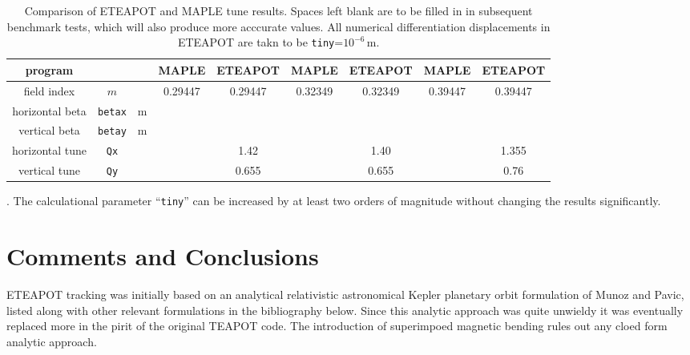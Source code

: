 \documentclass[12pt]{article}
\begin{document}
\begin{table}[h]
\begin{tabular}{|c|c|c|cc|cc|cc|}           \hline
program                    &                        &       &    MAPLE  &  ETEAPOT &   MAPLE  &  ETEAPOT  &  MAPLE    &  ETEAPOT     \\ \hline
field index                 &    $m$             &       &  0.29447 &   0.29447  & 0.32349  &  0.32349    &  0.39447 &  0.39447       \\ \hline 
horizontal beta         & {\tt betax}      &  m &                 &                  &                &                   &                &                      \\
vertical beta             & {\tt betay}      &  m &                 &                  &                &                   &                &                      \\  \hline 
horizontal tune         &  {\tt Qx}         &       &                 &     1.42      &                &    1.40        &                &    1.355         \\ 
vertical tune             &  {\tt Qy}         &       &                 &     0.655    &                &    0.655      &                &    0.76           \\  \hline
\end{tabular}
\caption{\label{tbl:benchmarkParams.P1.0}Comparison of ETEAPOT and MAPLE tune results.  Spaces left blank are to be filled in
in subsequent benchmark tests, which will also produce more acccurate values.   All numerical differentiation displacements 
in ETEAPOT are takn to be {\tt tiny}=$10^{-6}$\,m.}.  The calculational parameter ``{\tt tiny}'' can be increased by at least 
two orders of magnitude without changing the results significantly.
\end{table}
%

\section{Comments and Conclusions}
ETEAPOT tracking was initially based on an analytical relativistic astronomical Kepler planetary orbit formulation of 
Munoz and Pavic, listed along with other relevant formulations in the bibliography below.  Since this analytic approach was
quite unwieldy it was eventually replaced more in the pirit of the original TEAPOT code.  The introduction of superimpoed 
magnetic bending rules out any cloed form analytic approach.
\end{document}
